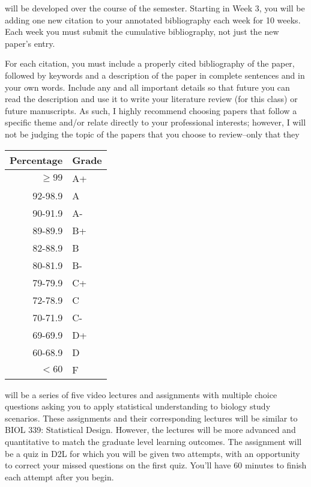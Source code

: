 \documentclass{tufte-handout}
\begin{document}
 will be developed over the course of the semester. Starting in Week 3, you will be adding one new citation to your annotated bibliography each week for 10 weeks. Each week you must submit the cumulative bibliography, not just the new paper's entry. 

For each citation, you must include a properly cited bibliography of the paper, followed by keywords and a description of the paper in complete sentences and in your own words. Include any and all important details so that future you can read the description and use it to write your literature review (for this class) or future manuscripts. As such, I highly recommend choosing papers that follow a specific theme and/or relate directly to your professional interests; however, I will not be judging the topic of the papers that you choose to review--only that they 



\begin{margintable}
\begin{tabular}{rl}
Percentage & Grade \\
\hline 
$\ge99$ & A+ \\
92-98.9 & A \\
90-91.9 & A- \\
89-89.9 & B+ \\
82-88.9 & B \\
80-81.9 & B- \\
79-79.9 & C+ \\
72-78.9 & C \\
70-71.9 & C- \\
69-69.9 & D+ \\
60-68.9 & D \\
$<60$ & F \\
\hline
\end{tabular}
\end{margintable}






 will be a series of five video lectures and assignments with multiple choice questions asking you to apply statistical understanding to biology study scenarios. These assignments and their corresponding lectures will be similar to BIOL 339: Statistical Design. However, the lectures will be more advanced and quantitative to match the graduate level learning outcomes. The assignment will be a quiz in D2L for which you will be given two attempts, with an opportunity to correct your missed questions on the first quiz. You'll have 60 minutes to finish each attempt after you begin. 
\end{document}
